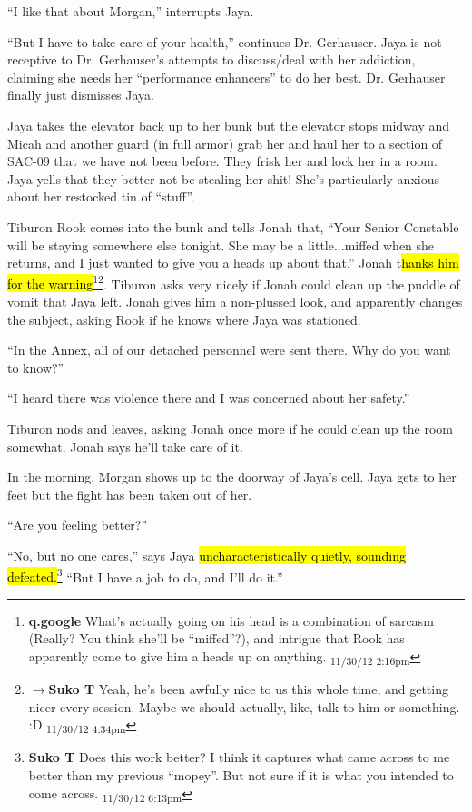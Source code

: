 ``I like that about Morgan,'' interrupts Jaya.

``But I have to take care of your health,'' continues Dr. Gerhauser.  Jaya is not receptive to Dr. Gerhauser's attempts to discuss/deal with her addiction, claiming she needs her ``performance enhancers'' to do her best.  Dr. Gerhauser finally just dismisses Jaya. 



Jaya takes the elevator back up to her bunk but the elevator stops midway and Micah and another guard (in full armor) grab her and haul her to a section of SAC-09 that we have not been before. They frisk her and lock her in a room.  Jaya yells that they better not be stealing her shit!  She's particularly anxious about her restocked tin of ``stuff''.



Tiburon Rook comes into the bunk and tells Jonah that, ``Your Senior Constable will be staying somewhere else tonight.  She may be a little...miffed when she returns, and I just wanted to give you a heads up about that.'' Jonah t\hl{hanks him for the warning}\footnote{\textbf{q.google }What's actually going on his head is a combination of sarcasm (Really?  You think she'll be ``miffed''?), and intrigue that Rook has apparently come to give him a heads up on anything. \textsubscript{11/30/12 2:16pm}}\footnote{$\rightarrow$\textbf{Suko T }Yeah, he's been awfully nice to us this whole time, and getting nicer every session.  Maybe we should actually, like, talk to him or something. :D \textsubscript{11/30/12 4:34pm}}.  Tiburon asks very nicely if Jonah could clean up the puddle of vomit that Jaya left.  Jonah gives him a non-plussed look, and apparently changes the subject, asking Rook if he knows where Jaya was stationed.

``In the Annex, all of our detached personnel were sent there.  Why do you want to know?''

``I heard there was violence there and I was concerned about her safety.''

Tiburon nods and leaves, asking Jonah once more if he could clean up the room somewhat.  Jonah says he'll take care of it.



In the morning, Morgan shows up to the doorway of Jaya's cell.  Jaya gets to her feet but the fight has been taken out of her.

``Are you feeling better?''

``No, but no one cares,'' says Jaya \hl{uncharacteristically quietly, sounding defeated.}\footnote{\textbf{Suko T }Does this work better?  I think it captures what came across to me better than my previous ``mopey''.  But not sure if it is what you intended to come across. \textsubscript{11/30/12 6:13pm}} ``But I have a job to do, and I'll do it.''

